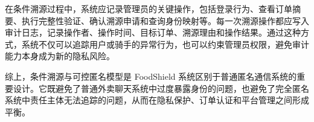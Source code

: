 在条件溯源过程中，系统应记录管理员的关键操作，包括登录行为、查看订单摘要、执行完整性验证、确认溯源申请和查询身份映射等。每一次溯源操作都应写入审计日志，记录操作者、操作时间、目标订单、溯源理由和操作结果。通过这种方式，系统不仅可以追踪用户或骑手的异常行为，也可以约束管理员权限，避免审计能力本身成为新的隐私风险。



综上，条件溯源与可控匿名模型是 FoodShield 系统区别于普通匿名通信系统的重要设计。它既避免了普通外卖聊天系统中过度暴露身份的问题，也避免了完全匿名系统中责任主体无法追踪的问题，从而在隐私保护、订单认证和平台管理之间形成平衡。
